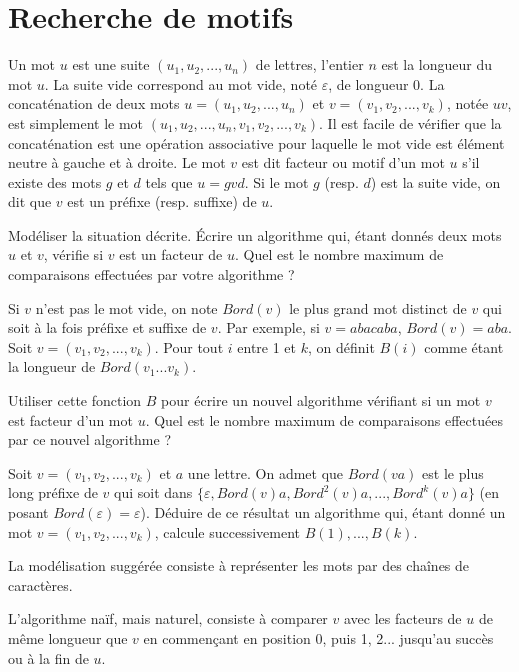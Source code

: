 \renewcommand{\SourceFile}{2-jouer-avec-les-mots/src/2-4.ml}

\section{Recherche de motifs}

Un mot $u$ est une suite $(u_1, u_2, ..., u_n)$ de lettres, l'entier $n$ est la longueur du mot $u$. La suite vide correspond au mot vide, noté $\varepsilon$, de longueur 0. La concaténation de deux mots $u=(u_1, u_2, ..., u_n)$ et $v=(v_1, v_2, ..., v_k)$, notée $uv$, est simplement le mot $(u_1, u_2, ..., u_n, v_1, v_2, ..., v_k)$. Il est facile de vérifier que la concaténation est une opération associative pour laquelle le mot vide est élément neutre à gauche et à droite. Le mot $v$ est dit facteur ou motif d'un mot $u$ s'il existe des mots $g$ et $d$ tels que $u=gvd$. Si le mot $g$ (resp. $d$) est la suite vide, on dit que $v$ est un préfixe (resp. suffixe) de $u$.

\Q
Modéliser la situation décrite. Écrire un algorithme qui, étant donnés deux mots $u$ et $v$, vérifie si $v$ est un facteur de $u$. Quel est le nombre maximum de comparaisons effectuées par votre algorithme ?

\Q
Si $v$ n'est pas le mot vide, on note $Bord(v)$ le plus grand mot distinct de $v$ qui soit à la fois préfixe et suffixe de $v$. Par exemple, si $v=abacaba$, $Bord(v)=aba$. Soit $v=(v_1, v_2, ..., v_k)$. Pour tout $i$ entre 1 et $k$, on définit $B(i)$ comme étant la longueur de $Bord(v_1 ... v_k)$.
\smallskip

Utiliser cette fonction $B$ pour écrire un nouvel algorithme vérifiant si un mot $v$ est facteur d'un mot $u$. Quel est le nombre maximum de comparaisons effectuées par ce nouvel algorithme ?

\Q
Soit $v=(v_1, v_2, ..., v_k)$ et $a$ une lettre. On admet que $Bord(va)$ est le plus long préfixe de $v$ qui soit dans $\{\varepsilon, Bord(v)a,Bord^2(v)a, ..., Bord^k(v)a\}$ (en posant $Bord(\varepsilon)=\varepsilon$). Déduire de ce résultat un algorithme qui, étant donné un mot $v=(v_1, v_2, ..., v_k)$, calcule successivement $B(1), ..., B(k)$.

\newpage

\Corrige

\Q
La modélisation suggérée consiste à représenter les mots par des chaînes de caractères.
\medskip

L'algorithme naïf, mais naturel, consiste à comparer $v$ avec les facteurs de $u$ de même longueur que $v$ en commençant en position 0, puis 1, 2... jusqu'au succès ou à la fin de $u$.


